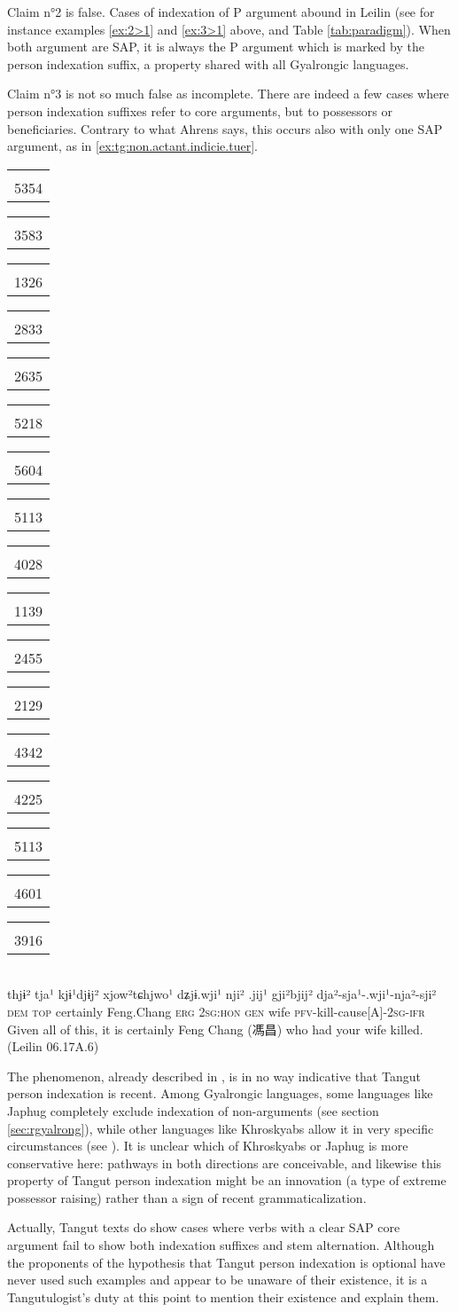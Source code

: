 \documentclass[oldfontcommands,oneside,a4paper,11pt]{article}
\newcommand{\ipa}[1]{{\phon \mbox{#1}}} %
\newcommand{\zh}[1]{{\cn #1}}
\newcommand{\tgf}[1]{\begin{tabular}{l}\mo{#1}\\{\tiny #1}\end{tabular}}
\begin{document}
Claim n°2 is false. Cases of indexation of P argument abound in Leilin (see for instance examples \ref{ex:2>1} and \ref{ex:3>1} above, and Table \ref{tab:paradigm}). When both argument are SAP, it is always the P argument which is marked by the person  indexation suffix, a property shared with all Gyalrongic languages.

Claim n°3 is not so much false as incomplete. There are indeed a few cases where person indexation suffixes refer to core arguments, but to possessors or beneficiaries. Contrary to what Ahrens says, this occurs also with only one SAP argument, as in \ref{ex:tg:non.actant.indicie.tuer}.


\begin{exe}
\ex \label{ex:tg:non.actant.indicie.tuer}
\glll
\tgf{5354}	\tgf{3583}	\tgf{1326}\tgf{2833}	\tgf{2635}\tgf{5218}	\tgf{5604}\tgf{5113}	\tgf{4028}	\tgf{1139} \tgf{2455}\tgf{2129}	\tgf{4342}\tgf{4225}\tgf{5113}\tgf{4601}\tgf{3916}\\
  \ipa{thjɨ²}	\ipa{tja¹}	\ipa{kjɨ¹djɨj²}	\ipa{xjow²tɕhjwo¹}	\ipa{dʑjɨ.wji¹}	\ipa{nji²}	\ipa{.jij¹}	\ipa{gji²bjij²}	\ipa{dja²-sja¹-.wji¹-nja²-sji²} \\
  \textsc{dem} \textsc{top} certainly Feng.Chang \textsc{erg} \textsc{2sg:hon} \textsc{gen} wife \textsc{pfv}-kill-cause[A]-\textsc{2sg-ifr} \\
\glt Given all of this, it is certainly Feng Chang (\zh{馮昌}) who had your wife killed. (Leilin 06.17A.6)
\end{exe}

The phenomenon, already described in \citet{kepping85}, is in no way indicative that Tangut person indexation is recent. Among Gyalrongic languages, some languages like Japhug completely exclude indexation of non-arguments (see section \ref{sec:rgyalrong}), while other languages like Khroskyabs allow it in very specific circumstances (see \citealt{lai14person}). It is unclear which of Khroskyabs or Japhug is more conservative here: pathways in both directions are conceivable, and likewise this property of Tangut person indexation might be an innovation (a type of extreme possessor raising) rather than a sign of recent grammaticalization.


Actually, Tangut texts do show cases where verbs with a clear SAP core argument fail to show both indexation suffixes and stem alternation. Although the proponents of the hypothesis that Tangut person indexation is optional have never used such examples and appear to be unaware of their existence, it is a Tangutulogist's duty at this point to mention their existence and explain them.
\end{document}
